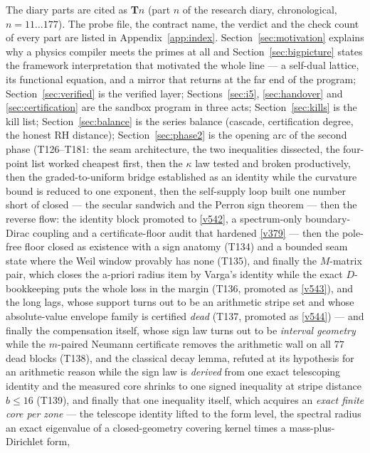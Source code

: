 \documentclass[11pt,a4paper]{article}
\begin{document}
\noindent The diary parts are cited as \textbf{T$n$} (part $n$ of the research diary, chronological,
$n=11\ldots177$). The probe file, the contract name, the verdict and the check count of every part are
listed in Appendix~\ref{app:index}. Section~\ref{sec:motivation} explains why a physics compiler meets
the primes at all and Section~\ref{sec:bigpicture} states the framework interpretation that motivated
the whole line --- a self-dual lattice, its functional equation, and a mirror that returns at the far
end of the program; Section~\ref{sec:verified} is the verified layer; Sections~\ref{sec:i5},
\ref{sec:handover} and \ref{sec:certification} are the sandbox program in three acts;
Section~\ref{sec:kills} is the kill list; Section~\ref{sec:balance} is the series balance (cascade,
certification degree, the honest RH distance); Section~\ref{sec:phase2} is the opening arc of the
second phase (T126--T181: the seam architecture, the two inequalities dissected, the four-point
list worked cheapest first, then the $\kappa$ law tested and broken productively, then the
graded-to-uniform bridge established as an identity while the curvature bound is reduced to one
exponent, then the self-supply loop built one number short of closed --- the secular sandwich and
the Perron sign theorem --- then the reverse flow: the identity block promoted to
\vref{v542}, a spectrum-only boundary-Dirac coupling and a certificate-floor audit that hardened
\vref{v379} --- then the pole-free floor closed as existence with a sign anatomy (T134)
and a bounded seam state where the Weil window provably has none (T135), and finally the
$M$-matrix pair, which closes the a-priori radius item by Varga's identity while the exact
$D$-bookkeeping puts the whole loss in the margin (T136, promoted as \vref{v543}), and the long
lags, whose support turns out to be an arithmetic stripe set and whose absolute-value envelope
family is certified \emph{dead} (T137, promoted as \vref{v544}) --- and finally the compensation
itself, whose sign law turns out to be \emph{interval geometry} while the $m$-paired Neumann
certificate removes the arithmetic wall on all $77$ dead blocks (T138), and the classical decay
lemma, refuted at its hypothesis for an arithmetic reason while the sign law is \emph{derived}
from one exact telescoping identity and the measured core shrinks to one signed inequality at
stripe distance $b\le16$ (T139), and finally that one inequality itself, which acquires an
\emph{exact finite core per zone} --- the telescope identity lifted to the form level, the spectral
radius an exact eigenvalue of a closed-geometry covering kernel times a mass-plus-Dirichlet form,
\end{document}
